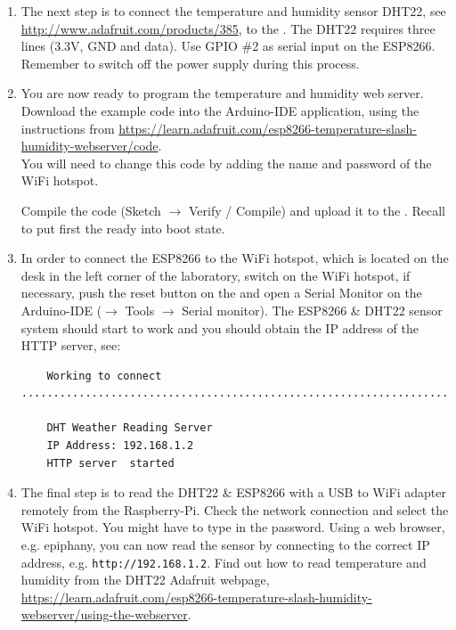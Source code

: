 \begin{enumerate}
\item The next step is to connect the temperature and humidity sensor DHT22, see \url{http://www.adafruit.com/products/385}, to the \microcontroller. The DHT22 requires  three lines (3.3V, GND and data). Use GPIO \#2 as serial input on the ESP8266. Remember to switch off the power supply during this process.


\item You are now ready to program the temperature and humidity web server. 
Download the example code into the Arduino-IDE application, using the instructions from \url{https://learn.adafruit.com/esp8266-temperature-slash-humidity-webserver/code}. \\
You will need to change this code by adding the name and password of the WiFi hotspot.
%

%
Compile the code (Sketch $\rightarrow$ Verify / Compile) and upload it
to the \microcontroller.  Recall to put first the \microcontroller ready into boot state.

\item In order to connect the ESP8266 \microcontroller to the WiFi hotspot, which  is located on the desk in the left corner of the laboratory, switch on the WiFi hotspot, if necessary, push the reset button on the \microcontroller and 
open a Serial Monitor on the  Arduino-IDE  ($\rightarrow$ Tools  $\rightarrow$ Serial monitor).
The ESP8266 \& DHT22 sensor system should start to work 
and you  should  obtain the IP address of the HTTP server, see:
\begin{verbatim}
    Working to connect ................................................................................................

    DHT Weather Reading Server
    IP Address: 192.168.1.2
    HTTP server  started
\end{verbatim}

\item The final step is to read the DHT22 \& ESP8266 with a USB to WiFi adapter
 remotely from  the Raspberry-Pi.
   Check the network connection and select the WiFi hotspot. You might have to type in the password. Using a web browser, e.g. epiphany, you can now read the sensor by connecting to the correct IP address, e.g. {\tt http://192.168.1.2}.
Find out how to read temperature and humidity from the DHT22 Adafruit webpage, 
\url{https://learn.adafruit.com/esp8266-temperature-slash-humidity-webserver/using-the-webserver}.

 
\end{enumerate}

